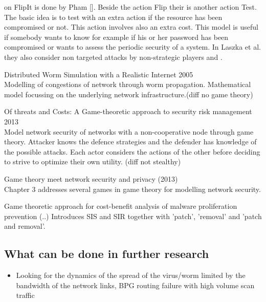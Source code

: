 on FlipIt is done by Pham\cite{GameTheorApprCostBenefitAnalyses} []. Beside the action Flip their is another action Test. The basic idea is to test with an extra action if the resource has been compromised or not. This action involves also an extra cost. This model is useful if somebody wants to know for example if his or her password has been compromised or wants to assess the periodic security of a system.  In \cite{MitigationCovert} \cite{MitigationNonTargeted} Laszka et al. they also consider non targeted attacks by non-strategic players and . \\


\begin{description}
\item Distributed Worm Simulation with a Realistic Internet 2005  \\
Modelling of congestions of network through worm propagation. Mathematical model focussing on the underlying network infrastructure.(diff no game theory) 
\item Of threats and Costs: A Game-theoretic approach to security risk management 2013\\
Model network security of networks with a non-cooperative node through game theory. Attacker knows the defence strategies and the defender has knowledge of the possible attacks. Each actor considers the actions of the other before deciding to strive to optimize their own utility. (diff not stealthy)
\item Game theory meet network security and privacy (2013) \\
Chapter 3 addresses several games in game theory for modelling network security.
\item Game theoretic approach for cost-benefit analysis of malware proliferation prevention (..)
Introduces SIS and SIR together with 'patch', 'removal' and 'patch and removal'.
\end{description}

\subsection{What can be done in further research}
\begin{itemize}
\item Looking for the dynamics of the spread of the virus/worm limited by the bandwidth of the network links, BPG routing failure with high volume scan traffic
\end{itemize}

